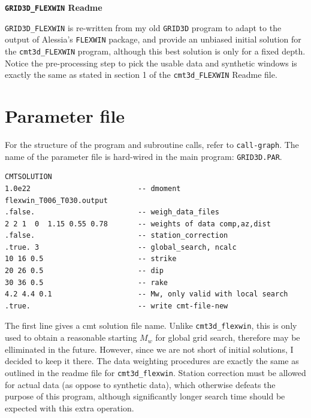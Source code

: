 \documentclass[12pt,titlepage,fleqn]{article}
\begin{document}
\begin{spacing}{1.0} %
\begin{center}

\Large {\vspace{0.1in} \bf \verb=GRID3D_FLEXWIN= Readme}
\end{center}

\end{spacing}

\verb=GRID3D_FLEXWIN= is re-written from my old \verb=GRID3D= program to adapt to the output of Alessia's \verb=FLEXWIN= package, and provide an unbiased initial solution for the \verb=cmt3d_FLEXWIN= program, although this best solution is only for a fixed depth. Notice the pre-processing step to pick the usable data and synthetic windows is exactly the same as stated in section 1 of the \verb=cmt3d_FLEXWIN= Readme file.

\section{Parameter file}

For the structure of the program and subroutine calls, refer to \verb=call-graph=. The name of the parameter file is hard-wired in the main program: \verb=GRID3D.PAR=.

\begin{verbatim}
CMTSOLUTION
1.0e22                         -- dmoment
flexwin_T006_T030.output
.false.                        -- weigh_data_files
2 2 1  0  1.15 0.55 0.78       -- weights of data comp,az,dist
.false.                        -- station_correction
.true. 3                       -- global_search, ncalc
10 16 0.5                      -- strike
20 26 0.5                      -- dip
30 36 0.5                      -- rake
4.2 4.4 0.1                    -- Mw, only valid with local search
.true.                         -- write cmt-file-new
\end{verbatim}

The first line gives a cmt solution file name. Unlike \verb=cmt3d_flexwin=, this is only used to obtain a reasonable starting $M_w$ for global grid search, therefore may be elliminated in the future. However, since we are not short of initial solutions, I decided to keep it there. The data weighting procedures are exactly the same as outlined in the readme file for \verb=cmt3d_flexwin=. Station correction must be allowed for actual data (as oppose to synthetic data), which otherwise defeats the purpose of this program, although significantly longer search time should be expected with this extra operation.
\end{document}
